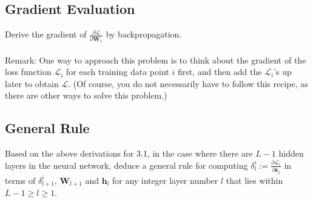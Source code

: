 \documentclass{exam}
\newcommand{\zv}{\boldsymbol{z}}
\begin{document}
\subsection{Gradient Evaluation} Derive the gradient of $\frac{\partial \mathcal{L}}{\partial \mathbf{W}_1}$ by backpropagation. 
\\\\Remark: One way to approach this problem is to think about the gradient of the loss function $\mathcal{L}_i$ for each training data point $i$ first, and then add the $\mathcal{L}_i$'s up later to obtain $\mathcal{L}$. (Of course, you do not necessarily have to follow this recipe, as there are other ways to solve this problem.) 

\subsection{General Rule} Based on the above derivations for 3.1, in the case where there are $L - 1$ hidden layers in the neural network, deduce a general rule for computing $\delta_l^i := \frac{\partial \mathcal{L}_i}{\partial \zv_j}$ in terms of $\delta_{l + 1}^i$, $\mathbf{W}_{l + 1}$ and $\mathbf{h}_l$ for any integer layer number $l$ that lies within $L - 1 \geq l \geq 1$.
\end{document}
